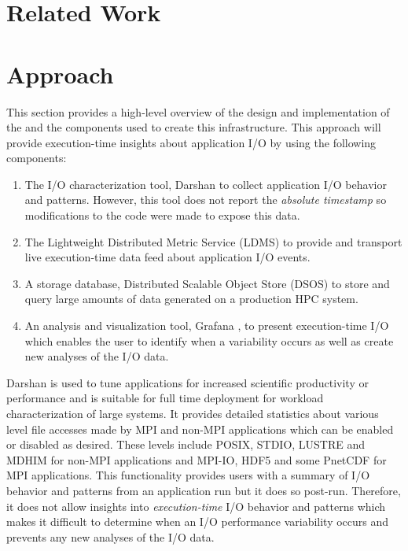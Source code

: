 \documentclass[conference]{IEEEtran}
\begin{document}
\section{Related Work}

\section{Approach}

This section provides a high-level overview of the design and implementation of the \Darshan and the components used to create this infrastructure. This approach will provide execution-time insights about application I/O by using the following components:
\begin{enumerate}
    \item The I/O characterization tool, Darshan  to collect application I/O behavior and patterns. However, this tool does not report the \emph{absolute timestamp} so modifications to the code were made to expose this data.
    \item The Lightweight Distributed Metric Service (LDMS)  to provide and transport live execution-time data feed about application I/O events.
    \item A storage database, Distributed Scalable Object Store (DSOS)  to store and query large amounts of data generated on a production HPC system.
    \item An analysis and visualization tool, Grafana , to present execution-time I/O which enables the user to identify when a variability occurs as well as create new analyses of the I/O data.
\end{enumerate}

Darshan is used to tune applications for increased scientific productivity or performance and is suitable for full time deployment for workload characterization of large systems. It provides detailed statistics about various level file accesses made by MPI and non-MPI applications which can be enabled or disabled as desired. These levels include POSIX, STDIO, LUSTRE and MDHIM for non-MPI applications and MPI-IO, HDF5 and some PnetCDF for MPI applications. This functionality provides users with a summary of I/O behavior and patterns from an application run but it does so post-run. Therefore, it does not allow insights into \emph{execution-time} I/O behavior and patterns which makes it difficult to determine when an I/O performance variability occurs and prevents any new analyses of the I/O data. 
\end{document}
